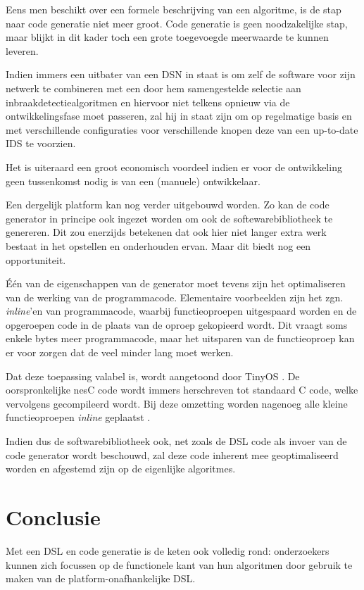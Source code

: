 Eens men beschikt over een formele beschrijving van een algoritme, is de stap
naar code generatie niet meer groot. Code generatie is geen noodzakelijke stap,
maar blijkt in dit kader toch een grote toegevoegde meerwaarde te kunnen
leveren.

Indien immers een uitbater van een DSN in staat is om zelf de software voor
zijn netwerk te combineren met een door hem samengestelde selectie aan
inbraakdetectiealgoritmen en hiervoor niet telkens opnieuw via de
ontwikkelingsfase moet passeren, zal hij in staat zijn om op regelmatige basis
en met verschillende configuraties voor verschillende knopen deze van een
up-to-date IDS te voorzien.

Het is uiteraard een groot economisch voordeel indien er voor de ontwikkeling
geen tussenkomst nodig is van een (manuele) ontwikkelaar.

Een dergelijk platform kan nog verder uitgebouwd worden. Zo kan de code
generator in principe ook ingezet worden om ook de softewarebibliotheek te
genereren. Dit zou enerzijds betekenen dat ook hier niet langer extra werk
bestaat in het opstellen en onderhouden ervan. Maar dit biedt nog een
opportuniteit.

\'E\'en van de eigenschappen van de generator moet tevens zijn het
optimaliseren van de werking van de programmacode. Elementaire voorbeelden zijn
het zgn. \emph{inline}'en van programmacode, waarbij functieoproepen
uitgespaard worden en de opgeroepen code in de plaats van de oproep gekopieerd
wordt. Dit vraagt soms enkele bytes meer programmacode, maar het uitsparen van
de functieoproep kan er voor zorgen dat de \mcu veel minder lang moet werken.

Dat deze toepassing valabel is, wordt aangetoond door TinyOS
\citep{levis2005tinyos}. De oorspronkelijke nesC code wordt immers herschreven
tot standaard C code, welke vervolgens gecompileerd wordt. Bij deze omzetting
worden nagenoeg alle kleine functieoproepen \emph{inline} geplaatst
\citep{gay2007software}.

Indien dus de softwarebibliotheek ook, net zoals de DSL code als invoer van de
code generator wordt beschouwd, zal deze code inherent mee geoptimaliseerd
worden en afgestemd zijn op de eigenlijke algoritmes.

\section{Conclusie}
\label{section:solution-conclusion}

Met een DSL en code generatie is de keten ook volledig rond: onderzoekers
kunnen zich focussen op de functionele kant van hun algoritmen door gebruik te
maken van de platform-onafhankelijke DSL.

